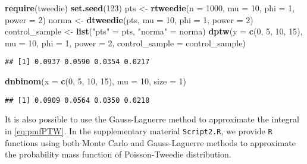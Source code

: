 \documentclass[9pt,a5paper,]{book}
\newenvironment{Shaded}{}{}
\newcommand{\KeywordTok}[1]{\textbf{{#1}}}
\newcommand{\DataTypeTok}[1]{\underline{{#1}}}
\newcommand{\DecValTok}[1]{{#1}}
\newcommand{\StringTok}[1]{{#1}}
\newcommand{\NormalTok}[1]{{#1}}
\renewenvironment{Shaded}{\color{inputcolor}}{}
\renewcommand{\DataTypeTok}[1]{{#1}}
\theoremstyle{definition}
\theoremstyle{definition}
\theoremstyle{remark}
\begin{document}
\begin{Shaded}
\begin{Highlighting}[]
\KeywordTok{require}\NormalTok{(tweedie)}
\KeywordTok{set.seed}\NormalTok{(}\DecValTok{123}\NormalTok{)}
\NormalTok{pts <-}\StringTok{ }\KeywordTok{rtweedie}\NormalTok{(}\DataTypeTok{n =} \DecValTok{1000}\NormalTok{, }\DataTypeTok{mu =} \DecValTok{10}\NormalTok{, }\DataTypeTok{phi =} \DecValTok{1}\NormalTok{, }\DataTypeTok{power =} \DecValTok{2}\NormalTok{)}
\NormalTok{norma <-}\StringTok{ }\KeywordTok{dtweedie}\NormalTok{(pts, }\DataTypeTok{mu =} \DecValTok{10}\NormalTok{, }\DataTypeTok{phi =} \DecValTok{1}\NormalTok{, }\DataTypeTok{power =} \DecValTok{2}\NormalTok{)}
\NormalTok{control_sample <-}\StringTok{ }\KeywordTok{list}\NormalTok{(}\StringTok{"pts"} \NormalTok{=}\StringTok{ }\NormalTok{pts, }\StringTok{"norma"} \NormalTok{=}\StringTok{ }\NormalTok{norma)}
\KeywordTok{dptw}\NormalTok{(}\DataTypeTok{y =} \KeywordTok{c}\NormalTok{(}\DecValTok{0}\NormalTok{, }\DecValTok{5}\NormalTok{, }\DecValTok{10}\NormalTok{, }\DecValTok{15}\NormalTok{), }\DataTypeTok{mu =} \DecValTok{10}\NormalTok{, }\DataTypeTok{phi =} \DecValTok{1}\NormalTok{, }\DataTypeTok{power =} \DecValTok{2}\NormalTok{,}
     \DataTypeTok{control_sample =} \NormalTok{control_sample)}
\end{Highlighting}
\end{Shaded}

\begin{verbatim}
## [1] 0.0937 0.0590 0.0354 0.0217
\end{verbatim}

\begin{Shaded}
\begin{Highlighting}[]
\KeywordTok{dnbinom}\NormalTok{(}\DataTypeTok{x =} \KeywordTok{c}\NormalTok{(}\DecValTok{0}\NormalTok{, }\DecValTok{5}\NormalTok{, }\DecValTok{10}\NormalTok{, }\DecValTok{15}\NormalTok{), }\DataTypeTok{mu =} \DecValTok{10}\NormalTok{, }\DataTypeTok{size =} \DecValTok{1}\NormalTok{)}
\end{Highlighting}
\end{Shaded}

\begin{verbatim}
## [1] 0.0909 0.0564 0.0350 0.0218
\end{verbatim}

It is also possible to use the Gauss-Laguerre method to approximate the
integral in \eqref{eq:pmfPTW}. In the supplementary material
\texttt{Script2.R}, we provide \texttt{R} functions using both Monte
Carlo and Gauss-Laguerre methods to approximate the probability mass
function of Poisson-Tweedie distribution.
\end{document}
